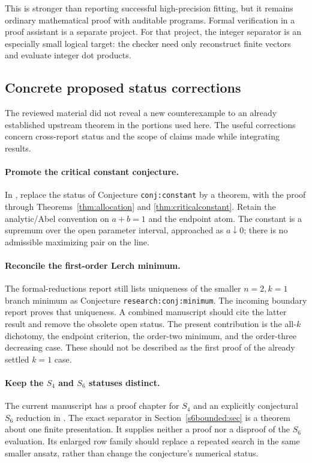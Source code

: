 \documentclass[11pt,a4paper]{article}
\numberwithin{equation}{section}
\theoremstyle{definition}
\theoremstyle{remark}
\begin{document}
This is stronger than reporting successful high-precision fitting,
but it remains ordinary mathematical proof with auditable programs.
Formal verification in a proof assistant is a separate project. For
that project, the integer separator is an especially small logical
target: the checker need only reconstruct finite vectors and evaluate
integer dot products.

\subsection{Concrete proposed status corrections}

The reviewed material did not reveal a new counterexample to an
already established upstream theorem in the portions used here.
The useful corrections concern cross-report status and the scope of
claims made while integrating results.

\paragraph{Promote the critical constant conjecture.}
In \cite{realorder}, replace the status of Conjecture
\texttt{conj:constant} by a theorem, with the proof through
Theorems~\ref{thm:allocation} and \ref{thm:criticalconstant}.
Retain the analytic/Abel convention on $a+b=1$ and the endpoint atom.
The constant is a supremum over the open parameter interval, approached
as $a\downarrow0$; there is no admissible maximizing pair on the line.

\paragraph{Reconcile the first-order Lerch minimum.}
The formal-reductions report \cite{formalreductions} still lists
uniqueness of the smaller $n=2,k=1$ branch minimum as Conjecture
\texttt{research:conj:minimum}. The incoming boundary report
\cite{lershape:Boundary} proves that uniqueness. A combined manuscript
should cite the latter result and remove the obsolete open status.
The present contribution is the all-$k$ dichotomy, the endpoint
criterion, the order-two minimum, and the order-three decreasing
case. These should not be described as the first proof of the
already settled $k=1$ case.

\paragraph{Keep the $S_4$ and $S_6$ statuses distinct.}
The current manuscript has a proof chapter for $S_4$ and an explicitly
conjectural $S_6$ reduction in
. The exact separator in
Section~\ref{s6bounded:sec} is a theorem about one finite presentation.
It supplies neither a proof nor a disproof of the $S_6$ evaluation.
Its enlarged row family should replace a repeated search in the same
smaller ansatz, rather than change the conjecture's numerical status.
\end{document}
